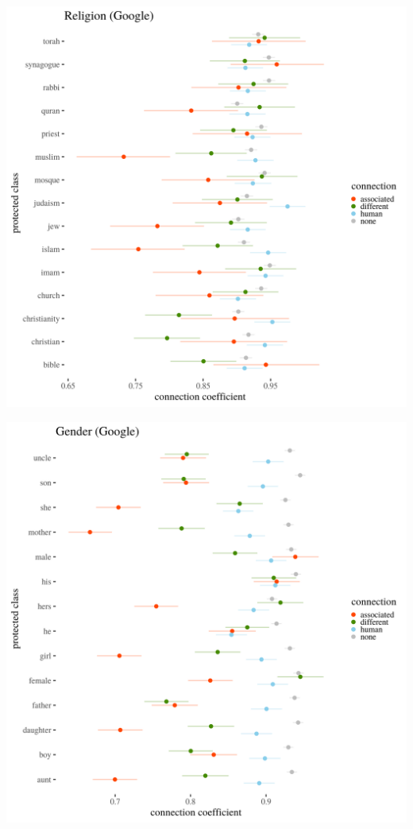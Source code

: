\documentclass[
  12pt,
]{book}
\begin{document}

\includegraphics[width=14cm]{../images/visReligionGoogle.png}

\includegraphics[width=14cm]{../images/visGenderGoogle.png}
\end{document}
